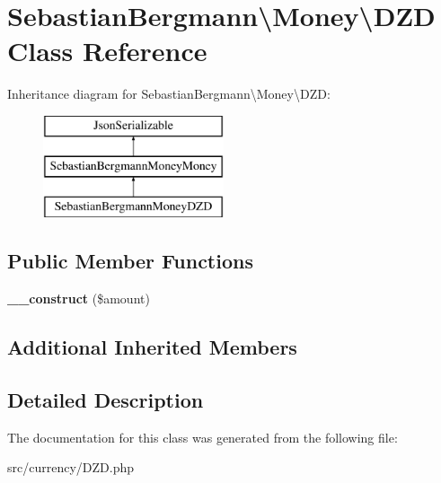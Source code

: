 \hypertarget{classSebastianBergmann_1_1Money_1_1DZD}{}\section{Sebastian\+Bergmann\textbackslash{}Money\textbackslash{}D\+Z\+D Class Reference}
\label{classSebastianBergmann_1_1Money_1_1DZD}
Inheritance diagram for Sebastian\+Bergmann\textbackslash{}Money\textbackslash{}D\+Z\+D\+:\begin{figure}[H]
\begin{center}
\leavevmode
\includegraphics[height=3.000000cm]{classSebastianBergmann_1_1Money_1_1DZD}
\end{center}
\end{figure}
\subsection*{Public Member Functions}
\begin{DoxyCompactItemize}
\item 
\hypertarget{classSebastianBergmann_1_1Money_1_1DZD_a7126b803b8a858c26381b196eb4ebae8}{}{\bfseries \+\_\+\+\_\+construct} (\$amount)\label{classSebastianBergmann_1_1Money_1_1DZD_a7126b803b8a858c26381b196eb4ebae8}

\end{DoxyCompactItemize}
\subsection*{Additional Inherited Members}


\subsection{Detailed Description}


The documentation for this class was generated from the following file\+:\begin{DoxyCompactItemize}
\item 
src/currency/D\+Z\+D.\+php\end{DoxyCompactItemize}
